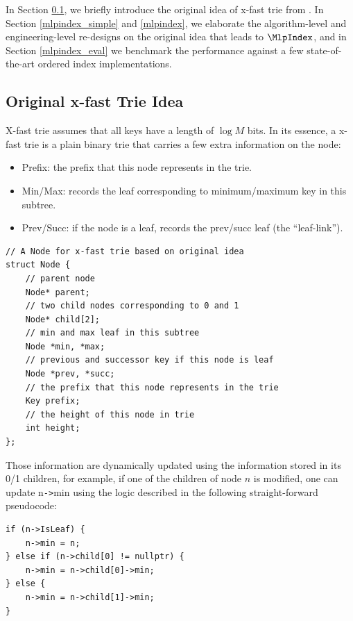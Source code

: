 \documentclass[11pt, usletter]{article}
\begin{document}
In Section \ref{intro_xfast}, we briefly introduce the original idea of x-fast trie from \cite{xfast}. 
In Section \ref{mlpindex_simple} and \ref{mlpindex}, 
we elaborate the algorithm-level and engineering-level re-designs on the original idea that leads to $\MlpIndex$, 
and in Section \ref{mlpindex_eval} we benchmark the performance against a few state-of-the-art ordered index implementations. 

\subsection{Original x-fast Trie Idea} \label{intro_xfast}

X-fast trie assumes that all keys have a length of $\log M$ bits.
In its essence, a x-fast trie is a plain binary trie that carries a few extra information on the node:
\begin{itemize}
[topsep=0pt,partopsep=0pt,itemsep=0pt,parsep=0pt,fullwidth,itemindent=\parindent,listparindent=\parindent]
\item Prefix: the prefix that this node represents in the trie.
\item Min/Max: records the leaf corresponding to minimum/maximum key in this subtree.
\item Prev/Succ: if the node is a leaf, records the prev/succ leaf (the ``leaf-link'').
\end{itemize}

\singlespacing\begin{codebox}
\begin{verbatim}
// A Node for x-fast trie based on original idea
struct Node {
    // parent node
    Node* parent;
    // two child nodes corresponding to 0 and 1
    Node* child[2];
    // min and max leaf in this subtree
    Node *min, *max;
    // previous and successor key if this node is leaf
    Node *prev, *succ;
    // the prefix that this node represents in the trie
    Key prefix;
    // the height of this node in trie
    int height;
};
\end{verbatim}
\end{codebox}\doublespacing

Those information are dynamically updated using the information stored in its 0/1 children, 
for example, if one of the children of node $n$ is modified, one can update n\verb|->|min
using the logic described in the following straight-forward pseudocode:

\singlespacing\begin{codebox}
\begin{verbatim}
if (n->IsLeaf) {
    n->min = n;
} else if (n->child[0] != nullptr) {
    n->min = n->child[0]->min;
} else {
    n->min = n->child[1]->min;
}
\end{verbatim}
\end{codebox}\doublespacing
\end{document}

